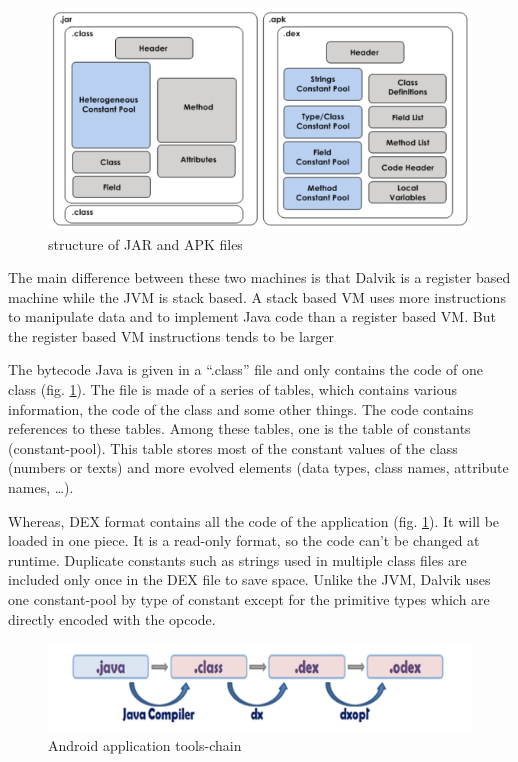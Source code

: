 \documentclass{sigplanconf}
\def \DALVIK{\mbox{Dalvik}\xspace}
\def \ANDROID{\mbox{Android}\xspace}
\def \JVM{JVM\xspace}
\def \DEX{\mbox{DEX}\xspace}
\begin{document}
      \begin{figure}[h]
        \centering \includegraphics[width=\columnwidth]{structure-jar-apk.png}
        \caption{structure of JAR and APK files}
        \label{SJA}
      \end{figure}

      The main difference between these two machines is that \DALVIK is a register based machine while the \JVM is stack based.
      A stack based VM uses more instructions to manipulate data and to implement Java code than a register based VM.
      But the register based VM instructions tends to be larger \cite{ieee-paul-kundu-energy-perspective}

      The bytecode Java is given in a ``.class'' file and only contains the code of one class (fig. \ref{SJA}).
      The file is made of a series of tables, which contains various information, the code of the class and some other things.
      The code contains references to these tables.
      Among these tables, one is the table of constants (constant-pool).
      This table stores most of the constant values of the class (numbers or texts)
      and more evolved elements (data types, class names, attribute names, \dots).

      Whereas, \DEX format contains all the code of the application (fig. \ref{SJA}).
      It will be loaded in one piece.
      It is a read-only format, so the code can't be changed at runtime.
      Duplicate constants such as strings used in multiple class files
      are included only once in the \DEX file to save space.
      Unlike the \JVM, \DALVIK uses one constant-pool by type of constant
      except for the primitive types which are directly encoded with the opcode.\\

      \begin{figure}[t]
        \centering \includegraphics[width=\columnwidth]{dex-tools-chain.png}
        \caption{\ANDROID application tools-chain}
        \label{DTC}
      \end{figure}
\end{document}
